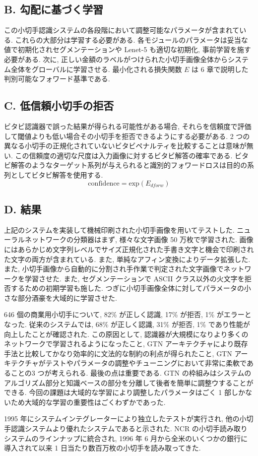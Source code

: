 \documentclass[twocolumn]{jarticle}     %
\begin{document}
\subsection*{B. 勾配に基づく学習}
この小切手認識システムの各段階において調整可能なパラメータが含まれている. これらの大部分は学習する必要がある. 各モジュールのパラメータは妥当な値で初期化されセグメンテーションや Lenet-5 も適切な初期化, 事前学習を施す必要がある. 次に, 正しい金額のラベルがつけられた小切手画像全体からシステム全体をグローバルに学習させる. 
最小化される損失関数 $E$ は 6 章で説明した判別可能なフォワード基準である.

\subsection*{C. 低信頼小切手の拒否}
ビタビ認識器で誤った結果が得られる可能性がある場合, それらを信頼度で評価して閾値よりも低い場合その小切手を拒否できるようにする必要がある. 2 つの異なる小切手の正規化されていないビタビペナルティを比較することは意味が無い. この信頼度の適切な尺度は入力画像に対するビタビ解答の確率である. ビタビ解答のようなターゲット系列が与えられると識別的フォワードロスは目的の系列としてビタビ解答を使用する. 
\begin{equation*}
  \mathrm{confidence} = \mathrm{exp}(E_{dforw})
\end{equation*}

\subsection*{D. 結果}
上記のシステムを実装して機械印刷された小切手画像を用いてテストした. ニューラルネットワークの分類器はまず, 様々な文字画像 50 万枚で学習された. 画像にはあらかじめ文字列レベルでサイズ正規化された手書き文字と機会で印刷された文字の両方が含まれている. また, 単純なアフィン変換によりデータ拡張した. また, 小切手画像から自動的に分割され手作業で判定された文字画像でネットワークを学習させた. また, セグメンテーションで ASCII クラス以外の火文字を拒否するための初期学習も施した. 
つぎに小切手画像全体に対してパラメータの小さな部分酒豪を大域的に学習させた. 
\par
646 個の商業用小切手について, 82\% が正しく認識, 17\% が拒否, 1\% がエラーとなった. 
従来のシステムでは, 68\% が正しく認識, 31\% が拒否, 1\% であり性能が向上したことが確認された.
この原因として, 認識器が大規模になりより多くのネットワークで学習されるようになったこと, GTN アーキテクチャにより既存手法と比較してかなり効率的に文法的な制約の利点が得られたこと,  GTN アーキテクチャがテストやパラメータの調整やチューニングにおいて非常に柔軟であることの3 つが考えられる. 最後の点は重要である. GTN の枠組みはシステムのアルゴリズム部分と知識ベースの部分を分離して後者を簡単に調整ウすることができる. 今回の課題は大域的な学習により調整したパラメータはごく 1 部しかないため大域的な学習の重要性はごくわずかであった. \par
1995 年にシステムインテグレーターにより独立したテストが実行され, 他の小切手認識システムより優れたシステムであると示された. NCR の小切手読み取りシステムのラインナップに統合され, 1996 年 6 月から全米のいくつかの銀行に導入されて以来 1 日当たり数百万枚の小切手を読み取ってきた. 
\end{document}
